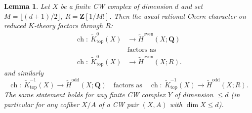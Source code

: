 \documentclass[11pt]{amsart}
\newtheorem{lemma}{Lemma}[section]
\numberwithin{equation}{section}
\newcommand{\ch}{{\operatorname{ch}}}
\newcommand{\topp}{{\operatorname{top}}}
\numberwithin{equation}{section}
\begin{document}

\begin{lemma}\label{chint}
Let $X$ be a finite CW complex of dimension $d$ and set $M=\lfloor(d+1)/2\rfloor$, $R=\mathbf{Z}[1/M!]$.
Then the usual rational Chern character on reduced $K$-theory factors through $R$:
\[
\begin{aligned}
\ch:\ \widetilde{K}_{\topp}^{0}(X)&\longrightarrow \widetilde H^{\mathrm{even}}(X;\mathbf{Q}) \\
&\text{factors as} \\
\ch:\ \widetilde{K}_{\topp}^{0}(X)&\longrightarrow \widetilde H^{\mathrm{even}}(X;R).
\end{aligned}
\]
and similarly
\[
\ch:\ \widetilde{K}_{\topp}^{-1}(X)\longrightarrow \widetilde H^{\mathrm{odd}}(X;\mathbf{Q})
\quad\text{factors as}\quad
\ch:\ \widetilde{K}_{\topp}^{-1}(X)\longrightarrow \widetilde H^{\mathrm{odd}}(X;R).
\]
The same statement holds for any finite CW complex $Y$ of dimension $\le d$ (in particular for any cofiber $X/A$
of a CW pair $(X,A)$ with $\dim X\le d$).
\end{lemma}
\end{document}
